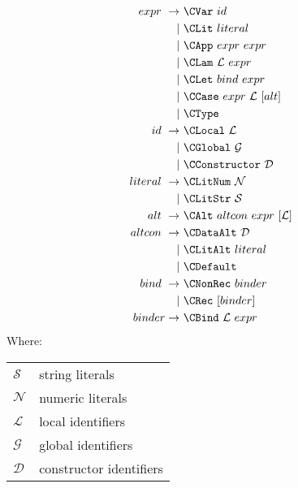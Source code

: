 \begin{equation}\label{fig:coresyntax}
  \begin{split}
    expr\    \rightarrow\ & \CVar\ id                          \\
                       |\ & \CLit\ literal                     \\
                       |\ & \CApp\ expr\ expr                  \\
                       |\ & \CLam\ \mathcal{L}\ expr           \\
                       |\ & \CLet\ bind\ expr                  \\
                       |\ & \CCase\ expr\ \mathcal{L}\ [alt]   \\
                       |\ & \CType                             \\
    id\      \rightarrow\ & \CLocal\       \mathcal{L}         \\
                       |\ & \CGlobal\      \mathcal{G}         \\
                       |\ & \CConstructor\ \mathcal{D}         \\
    literal\ \rightarrow\ & \CLitNum\ \mathcal{N}              \\
                       |\ & \CLitStr\ \mathcal{S}              \\
    alt\     \rightarrow\ & \CAlt\ altcon\ expr\ [\mathcal{L}] \\
    altcon\  \rightarrow\ & \CDataAlt\ \mathcal{D}             \\
                       |\ & \CLitAlt\ literal                  \\
                       |\ & \CDefault                          \\
    bind\    \rightarrow\ & \CNonRec\ binder                   \\
                       |\ & \CRec\ [binder]                    \\
    binder   \rightarrow\ & \CBind\ \mathcal{L}\ expr
  \end{split}
\end{equation}
Where:
\begin{tabular}[t]{l @{ $=$ } l}
  $\mathcal{S}$ & string literals    \\
  $\mathcal{N}$ & numeric literals   \\
  $\mathcal{L}$ & local identifiers  \\
  $\mathcal{G}$ & global identifiers \\
  $\mathcal{D}$ & constructor identifiers
\end{tabular}

